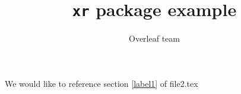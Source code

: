 \documentclass{article}
\title{\texttt{xr} package example}
\author{Overleaf team}
\begin{document}
\maketitle
We would like to reference section \ref{label1} of file2.tex
\end{document}
